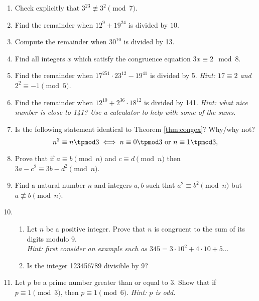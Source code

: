 \begin{enumerate}\renewcommand{\labelenumi}{\thesubsection.\theenumi}
  \item Check explicitly that $3^{23}\not\equiv 3^2\pmod 7$.
  
  \item Find the remainder when $12^9+19^{24}$ is divided by $10$.
  
  \item Compute the remainder when $30^{10}$ is divided by 13.
  
  \item Find all integers $x$ which satisfy the congruence equation $3x\equiv 2\mod 8$.
  
  \item Find the remainder when $17^{251}\cdot 23^{12}-19^{41}$ is divided by 5. \emph{Hint: $17\equiv 2$ and $2^2\equiv -1\pmod 5$.}
  
  \item Find the remainder when $12^{10}+2^{36}\cdot 18^{12}$ is divided by 141. \emph{Hint: what nice number is close to 141? Use a calculator to help with some of the sums.}
  
  \item Is the following statement identical to Theorem \ref{thm:congex}? Why/why not?
  \[n^2\equiv n\tpmod 3\iff n\equiv 0\tpmod 3\text{ or }n\equiv 1\tpmod 3,\]
  
  \item Prove that if $a\equiv b\pmod n$ and $c\equiv d\pmod n$ then $3a-c^2\equiv 3b-d^2\pmod n$.

  \item Find a natural number $n$ and integers $a,b$ such that $a^2\equiv b^2\pmod n$ but $a\not\equiv b\pmod n$.
  
  \item\begin{enumerate}
    \item Let $n$ be a positive integer. Prove that $n$ is congruent to the sum of its digits modulo 9.\\
    \emph{Hint: first consider an example such as $345=3\cdot 10^2+4\cdot 10+5\ldots$}
    \item Is the integer 123456789 divisible by 9?
  \end{enumerate}
  
  \item Let $p$ be a prime number greater than or equal to 3. Show that if $p\equiv 1\pmod 3$, then $p\equiv 1\pmod 6$. \emph{Hint: $p$ is odd.} 
  

\end{enumerate}

